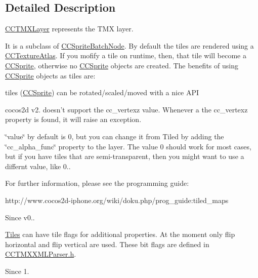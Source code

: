 \subsection{Detailed Description}
\hyperlink{interface_c_c_t_m_x_layer}{C\-C\-T\-M\-X\-Layer} represents the T\-M\-X layer.

It is a subclass of \hyperlink{interface_c_c_sprite_batch_node}{C\-C\-Sprite\-Batch\-Node}. By default the tiles are rendered using a \hyperlink{interface_c_c_texture_atlas}{C\-C\-Texture\-Atlas}. If you mofify a tile on runtime, then, that tile will become a \hyperlink{class_c_c_sprite}{C\-C\-Sprite}, otherwise no \hyperlink{class_c_c_sprite}{C\-C\-Sprite} objects are created. The benefits of using \hyperlink{class_c_c_sprite}{C\-C\-Sprite} objects as tiles are\-:
\begin{DoxyItemize}
\item tiles (\hyperlink{class_c_c_sprite}{C\-C\-Sprite}) can be rotated/scaled/moved with a nice A\-P\-I
\end{DoxyItemize}

cocos2d v2. doesn't support the cc\-\_\-vertexz value. Whenever a the cc\-\_\-vertexz property is found, it will raise an exception.

\char`\"{}value\char`\"{} by default is 0, but you can change it from Tiled by adding the \char`\"{}cc\-\_\-alpha\-\_\-func\char`\"{} property to the layer. The value 0 should work for most cases, but if you have tiles that are semi-\/transparent, then you might want to use a differnt value, like 0..

For further information, please see the programming guide\-: \begin{DoxyVerb}   http://www.cocos2d-iphone.org/wiki/doku.php/prog_guide:tiled_maps\end{DoxyVerb}
 \begin{DoxySince}{Since}
v0..
\end{DoxySince}
\hyperlink{class_tiles}{Tiles} can have tile flags for additional properties. At the moment only flip horizontal and flip vertical are used. These bit flags are defined in \hyperlink{_c_c_t_m_x_x_m_l_parser_8h_source}{C\-C\-T\-M\-X\-X\-M\-L\-Parser.\-h}.

\begin{DoxySince}{Since}
1. 
\end{DoxySince}


